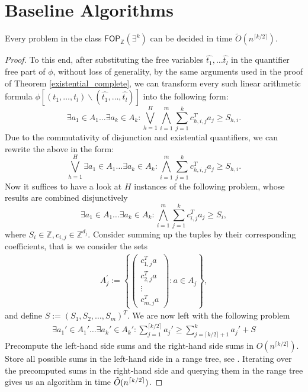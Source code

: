 \section{Baseline Algorithms} \label{sec:baseline}
\begin{lemma}
Every problem in the class $ \mathsf{FOP}_{\mathbb{Z}}(\exists^k)$ can be decided in time $\tilde{O}(n^{\lceil k/2 \rceil})$.
\label{baseline_exist}
\end{lemma}
\begin{proof}
    To this end, after substituting the free variables $\hat{t_1}, \dots \hat{t_l}$ in the quantifier free part of $\phi$, without loss 
    of generality, by the same arguments used in the proof of Theorem \ref{existential_complete}, we can transform every such linear arithmetic formula $\phi[(t_1,\dots,t_l)\backslash(\hat{t_1},\dots,\hat{t_l})]$ into the following form:
    $$\exists a_1 \in A_1 \dots \exists a_k \in A_k:\bigvee_{h=1}^{H}\bigwedge_{i=1}^{m} \sum_{j=1}^{k}c_{h,i,j}^T  a_j \geq S_{h,i}.$$
    Due to the commutativity of disjunction and existential quantifiers, we can rewrite the above in the form:
    $$ \bigvee_{h=1}^{H}\exists a_1 \in A_1  \dots \exists a_k \in A_k:\bigwedge_{i=1}^{m} \sum_{j=1}^{k}c_{h,i,j}^T  a_j \geq S_{h,i}.$$
    Now it suffices to have a look at $H$ instances of the following problem, whose results are combined disjunctively
    $$\exists a_1 \in A_1  \dots \exists a_k \in A_k:\bigwedge_{i=1}^{m} \sum_{j=1}^{k}c_{i,j}^T  a_j \geq S_i,$$
    where $S_i \in \mathbb{Z},c_{i,j} \in \mathbb{Z}^{d_j}.$
    Consider summing up the tuples by their corresponding coefficients, that is we consider the sets 
\begin{align*}
  A_j^{'}:=\left\{ \left(\begin{array}{c}
  c_{1,j}^T a  \\
  c_{2,j}^T a \\
  \vdots  \\
  c_{m,j}^T a
  \end{array}\right)   : a \in A_j \right\},
\end{align*}
and define $S:=(S_1,S_2,\dots,S_m)^T$.
We are now left with the following problem
\begin{align*}
\exists a_1' \in A_1' \dots \exists a_k' \in A_k': \sum_{j=1}^{\lceil k/2 \rceil }a_j' \geq \sum_{j=\lceil k/2 \rceil +1}^{ k } a_j' + S
\end{align*}
Precompute the left-hand side sums and the right-hand side sums in $O(n^{\lceil k/2 \rceil })$. Store all possible sums in the left-hand side in a range tree, see \cite{DBLP:conf/focs/AlstrupBR00}.  Iterating over the precomputed sums in the right-hand side and querying them in the range tree gives us an algorithm in time $\Tilde{O}(n^{\lceil k/2 \rceil })$.
\end{proof}

